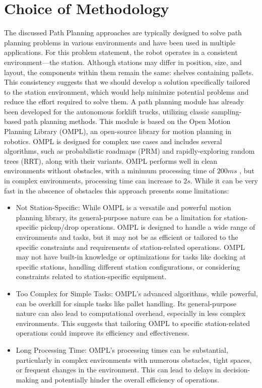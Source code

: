 \section{Choice of Methodology}
The discussed Path Planning approaches are typically
designed to solve path planning problems in various environments and have been used in multiple
applications.
For this problem statement, the robot operates in a consistent environment—the station. 
Although stations may differ in 
position, size, and layout, the components within them remain the same: shelves containing pallets. 
This consistency suggests that we should 
develop a solution specifically tailored to the station environment, which would help minimize potential problems 
and reduce the effort required to solve them. A path planning module has already been developed for the autonomous 
forklift trucks, utilizing classic sampling-based path planning methods. This module is based on the Open Motion 
Planning Library (OMPL), an open-source library for motion planning in robotics. OMPL is designed for complex use 
cases and includes several algorithms, such as probabilistic roadmaps (PRM) and rapidly-exploring random trees 
(RRT), along with their variants. OMPL performs well in clean environments without obstacles, with a minimum 
processing time of \(200ms\) , but in complex environments, processing time can increase to \(2s\).
While it can be very fast in the abscence of obstacles this approach presents some limitations:
\begin{itemize}
    \item Not Station-Specific: While OMPL is a versatile and powerful motion planning library, its general-purpose 
    nature can be a limitation for station-specific pickup/drop operations. OMPL is designed to handle a wide range 
    of environments and tasks, but it may not be as efficient or tailored to the specific constraints and 
    requirements of station-related operations. OMPL may not have built-in knowledge or optimizations for tasks 
    like docking at specific stations, handling different station configurations, or considering constraints 
    related to station-specific equipment.

    \item Too Complex for Simple Tasks: OMPL's advanced algorithms, while powerful, can be overkill for simple tasks 
    like pallet handling. Its general-purpose nature can also lead to computational overhead, 
    especially in less complex environments. This suggests that tailoring OMPL to specific station-related 
    operations could improve its efficiency and effectiveness.
    
    \item Long Processing Time: OMPL's processing times can be substantial, particularly in complex environments 
    with numerous obstacles, tight spaces, or frequent changes in the environment. 
    This can lead to delays in decision-making and potentially hinder the overall efficiency of operations. 
\end{itemize}

